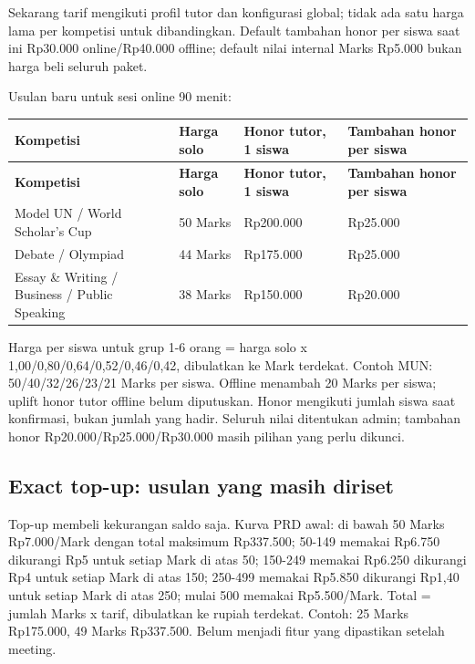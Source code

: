 \documentclass[10pt,a4paper]{article}
\begin{document}
Sekarang tarif mengikuti profil tutor dan konfigurasi global; tidak ada satu harga lama per kompetisi untuk dibandingkan. Default tambahan honor per siswa saat ini Rp30.000 online/\allowbreak{}Rp40.000 offline; default nilai internal Marks Rp5.000 bukan harga beli seluruh paket.

Usulan baru untuk sesi online 90 menit:

{\small
\begin{longtable}{L{25.40mm}L{44.45mm}L{44.45mm}L{44.45mm}}
\hline
\textbf{Kompetisi} & \textbf{Harga solo} & \textbf{Honor tutor, 1 siswa} & \textbf{Tambahan honor per siswa} \\ \hline
\endfirsthead
\hline
\textbf{Kompetisi} & \textbf{Harga solo} & \textbf{Honor tutor, 1 siswa} & \textbf{Tambahan honor per siswa} \\ \hline
\endhead
Model UN /\allowbreak{} World Scholar's Cup & 50 Marks & Rp200.000 & Rp25.000 \\ \hline
Debate /\allowbreak{} Olympiad & 44 Marks & Rp175.000 & Rp25.000 \\ \hline
Essay \& Writing /\allowbreak{} Business /\allowbreak{} Public Speaking & 38 Marks & Rp150.000 & Rp20.000 \\ \hline
\end{longtable}
}

Harga per siswa untuk grup 1-6 orang = harga solo  x  1,00/\allowbreak{}0,80/\allowbreak{}0,64/\allowbreak{}0,52/\allowbreak{}0,46/\allowbreak{}0,42, dibulatkan ke Mark terdekat. Contoh MUN: 50/\allowbreak{}40/\allowbreak{}32/\allowbreak{}26/\allowbreak{}23/\allowbreak{}21 Marks per siswa. Offline menambah 20 Marks per siswa; uplift honor tutor offline belum diputuskan. Honor mengikuti jumlah siswa saat konfirmasi, bukan jumlah yang hadir. Seluruh nilai ditentukan admin; tambahan honor Rp20.000/\allowbreak{}Rp25.000/\allowbreak{}Rp30.000 masih pilihan yang perlu dikunci.

\subsection*{Exact top-up: usulan yang masih diriset}

Top-up membeli kekurangan saldo saja. Kurva PRD awal: di bawah 50 Marks Rp7.000/\allowbreak{}Mark dengan total maksimum Rp337.500; 50-149 memakai Rp6.750 dikurangi Rp5 untuk setiap Mark di atas 50; 150-249 memakai Rp6.250 dikurangi Rp4 untuk setiap Mark di atas 150; 250-499 memakai Rp5.850 dikurangi Rp1,40 untuk setiap Mark di atas 250; mulai 500 memakai Rp5.500/\allowbreak{}Mark. Total = jumlah Marks  x  tarif, dibulatkan ke rupiah terdekat. Contoh: 25 Marks Rp175.000, 49 Marks Rp337.500. Belum menjadi fitur yang dipastikan setelah meeting.
\end{document}
